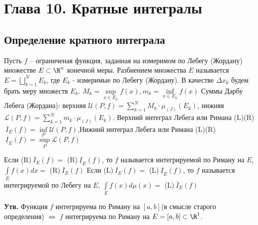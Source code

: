 \setcounter{section}{9}
\section{Глава 10. Кратные интегралы}
\subsection{Определение кратного интеграла}
\begin{Def}
Пусть $f$ -- ограниченая функция, заданная на измеримом по Лебегу (Жордану) множестве $E \subset \R^n$ конечной меры. $\textbf{Разбиением}$ множества $E$ называется $E=\bigsqcup\limits_{k=1}^N E_k$, где $E_k$ - измеримые по Лебегу (Жордану). \newline В качестве $\Delta x_k$ будем брать меру множеств $E_k$. $M_k=\sup\limits_{x\in E_k} f(x), m_k=\inf\limits_{x\in E_k}f(x)$ \newline
Суммы Дарбу Лебега (Жордана): верхняя $\mathcal{U}(P, f)=\sum\limits_{k=1}^N M_k \cdot \mu_{(J)}(E_k)$, нижняя $\mathcal{L}(P, f)=\sum\limits_{k=1}^N m_k \cdot \mu_{(J)}(E_k)$.
\newline Верхний интеграл Лебега или Римана (L)(R)$\ \overline{I}_E(f)=\inf\limits_P \mathcal{U}(P, f)$,\newline Нижний интеграл Лебега или Римана (L)(R)$\ \underline{I}_E(f)=\sup\limits_P \mathcal{L}(P, f)$
\end{Def}
\begin{Def}
Если (R)$\ \overline{I}_E(f)=$ (R)$\ \underline{I}_E(f)$, то $f$ называется интегрируемой по Риману на $E$, $\int\limits_E f(x)dx=$ (R)$\ \overline{I}_E(f)$ \newline
Если (L)$\ \overline{I}_E(f)=$ (L)$\ \underline{I}_E(f)$, то $f$ называется интегрируемой по Лебегу на $E$, $\int\limits_E f(x)d\mu (x)=$ (L)$\ \overline{I}_E(f)$
\end{Def}
\textbf{Утв.} Функция $f$ интегрируема по Риману на $[a,b]$(в смысле старого определения) $\Leftrightarrow$ $f$ интегрируема по Риману на $E=[a,b] \subset \R^1$.